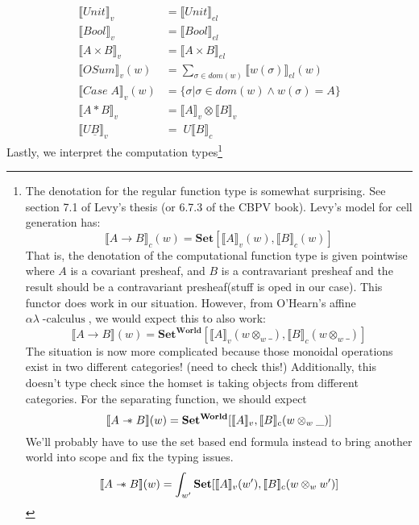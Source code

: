 \documentclass{article}
\newcommand{\den}[1]{\llbracket #1 \rrbracket}
\newcommand{\sep}{\mathrel{-\mkern-6mu*}}
\newcommand{\injj}[2]{\textrm{inj}_{#1}#2}
\newcommand{\world}{{\mathbf{World}}}
\newcommand{\calculus}{\operatorname{-calculus}}
\begin{document}
\begin{comment}
    

This means that $\sigma : \testrm{Case} (A \times (B \times C))$ and $\sigma' : \textrm{Case}((A \times B) \times C)$ are distinct elements 
of two distinct sets. 
It may be nice to have a more flexible definition 
$\{ \sigma | \sigma \in dom(\rho) \land \llbracket \rho(\sigma) \rrbracket_{el} \cong \llbracket A \rrbracket_{el}\}$. 
We would have to be more careful when constructing and destructing elements of $OSum$. 
Consider $\sigma : Case \;A$ and $\injj{\sigma}{(*,a)}: OSum$. 
Should this be allowed with $\llbracket A \rrbracket \cong \llbracket Unit \times A \rrbracket$?
\end{comment}

\begin{align*}
    \llbracket Unit \rrbracket_v &= \llbracket Unit \rrbracket_{el}\\
    \llbracket Bool \rrbracket_v &= \llbracket Bool \rrbracket_{el}\\
    \llbracket A \times B \rrbracket_v &= \llbracket A \times B \rrbracket_{el}\\
    \llbracket OSum \rrbracket_v (w)&= \sum_{\sigma \in dom(w)} \llbracket w(\sigma) \rrbracket_{el}(w)\\
    \llbracket Case \; A \rrbracket_v(w) &= \{ \sigma | \sigma \in dom(w) \land w(\sigma)= A \} \\
    \llbracket A * B \rrbracket_v &= \llbracket A \rrbracket_v \otimes \llbracket B \rrbracket_v \\
    \llbracket U  \underline{B} \rrbracket_v &= \; U \llbracket B \rrbracket_c 
\end{align*}
Lastly, we interpret the computation types\footnote{ The denotation for the regular function type is somewhat surprising. 
See section 7.1 of Levy's thesis (or 6.7.3 of the CBPV book). Levy's model for cell generation has:
\[
    \den{A \rightarrow B}_c(w)= \mathbf{Set} [ \den{A}_v(w) , \den{B}_c(w) ]
\]
That is, the denotation of the computational function type is given pointwise where $A$ is a covariant presheaf, and $B$ is a
contravariant presheaf and the result should be a contravariant presheaf(stuff is oped in our case). 
This functor does work in our situation. However, from O'Hearn's affine $\alpha\lambda\calculus$, we would expect this to also work:
\[
    \den{A \rightarrow B}(w)= \mathbf{Set^{\world}}[ \den{A}_v(w \otimes_w \_) , \den{B}_c(w \otimes_w \_)]
\]
The situation is now more complicated because those monoidal operations exist in two different categories!
(need to check this!) Additionally, this doesn't type check since the homset is taking objects from different categories.
For the separating function, we should expect
\[
    \den{A \sep B}(w)= \mathbf{Set^{\world}}[ \den{A}_v , \den{B}_c(w \otimes_w \_)]
\]
We'll probably have to use the set based end formula instead to bring another world
into scope and fix the typing issues.
\[
    \den{A \sep B}(w)= \int_{w'} \mathbf{Set}[ \den{A}_v(w') , \den{B}_c(w \otimes_w w') ]
\]
}
\end{document}
